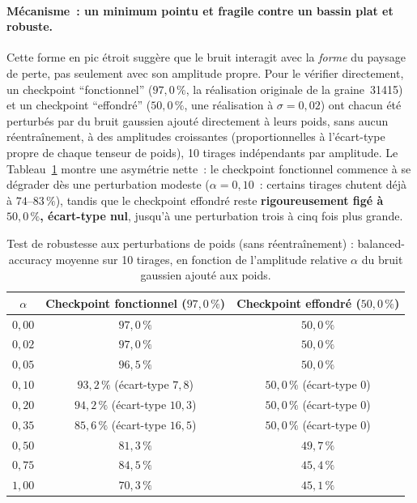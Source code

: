 \documentclass{acmart}
\begin{document}
\paragraph{Mécanisme~: un minimum pointu et fragile contre un bassin plat et
robuste.} Cette forme en pic étroit suggère que le bruit interagit avec la
\emph{forme} du paysage de perte, pas seulement avec son amplitude propre.
Pour le vérifier directement, un checkpoint ``fonctionnel'' ($97{,}0\,\%$,
la réalisation originale de la graine~31415) et un checkpoint ``effondré''
($50{,}0\,\%$, une réalisation à $\sigma=0{,}02$) ont chacun été perturbés
par du bruit gaussien ajouté directement à leurs poids, sans aucun
réentraînement, à des amplitudes croissantes (proportionnelles à
l'écart-type propre de chaque tenseur de poids), 10 tirages indépendants
par amplitude. Le Tableau~\ref{tab:sharpness_test} montre une asymétrie
nette~: le checkpoint fonctionnel commence à se dégrader dès une
perturbation modeste ($\alpha=0{,}10$~: certains tirages chutent déjà à
$74$--$83\,\%$), tandis que le checkpoint effondré reste \textbf{rigoureusement
figé à $50{,}0\,\%$, écart-type nul}, jusqu'à une perturbation trois à cinq
fois plus grande.

\begin{table}[h!]
  \centering
  \small
  \caption{Test de robustesse aux perturbations de poids (sans
  réentraînement) : balanced-accuracy moyenne sur 10 tirages, en fonction de
  l'amplitude relative $\alpha$ du bruit gaussien ajouté aux poids.}
  \label{tab:sharpness_test}
  \begin{tabular}{ccc}
    \toprule
    $\alpha$ & Checkpoint fonctionnel ($97{,}0\,\%$) & Checkpoint effondré ($50{,}0\,\%$) \\
    \midrule
    $0{,}00$ & $97{,}0\,\%$ & $50{,}0\,\%$ \\
    $0{,}02$ & $97{,}0\,\%$ & $50{,}0\,\%$ \\
    $0{,}05$ & $96{,}5\,\%$ & $50{,}0\,\%$ \\
    $0{,}10$ & $93{,}2\,\%$ (écart-type $7{,}8$) & $50{,}0\,\%$ (écart-type $0$) \\
    $0{,}20$ & $94{,}2\,\%$ (écart-type $10{,}3$) & $50{,}0\,\%$ (écart-type $0$) \\
    $0{,}35$ & $85{,}6\,\%$ (écart-type $16{,}5$) & $50{,}0\,\%$ (écart-type $0$) \\
    $0{,}50$ & $81{,}3\,\%$ & $49{,}7\,\%$ \\
    $0{,}75$ & $84{,}5\,\%$ & $45{,}4\,\%$ \\
    $1{,}00$ & $70{,}3\,\%$ & $45{,}1\,\%$ \\
    \bottomrule
  \end{tabular}
\end{table}
\end{document}

